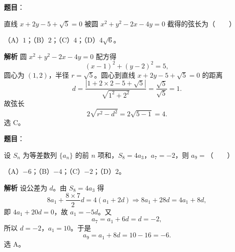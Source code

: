 \begin{answer}

\textbf{题目}：

直线 $x+2y-5+\sqrt5=0$ 被圆 $x^2+y^2-2x-4y=0$ 截得的弦长为\mbox{（　　）}

（A）$1$；（B）$2$；（C）$4$；（D）$4\sqrt6$。

\textbf{解析}
圆 $x^2+y^2-2x-4y=0$ 配方得
\nopagebreak[4]
\[(x-1)^2+(y-2)^2=5,\]
圆心为 $(1,2)$，半径 $r=\sqrt5$。圆心到直线 $x+2y-5+\sqrt5=0$ 的距离
\nopagebreak[4]
\[d=\frac{|1+2\times2-5+\sqrt5|}{\sqrt{1^2+2^2}}=\frac{\sqrt5}{\sqrt5}=1.\]
故弦长
\nopagebreak[4]
\[2\sqrt{r^2-d^2}=2\sqrt{5-1}=4.\]
选 C。


\end{answer}
\begin{answer}

\textbf{题目}：

设 $S_n$ 为等差数列 $\{a_n\}$ 的前 $n$ 项和，$S_8=4a_3$，$a_7=-2$，则 $a_9=$\mbox{（　　）}

（A）$-6$；（B）$-4$；（C）$-2$；（D）$2$。

\textbf{解析}
设公差为 $d$。由 $S_8=4a_3$ 得
\nopagebreak[4]
\[8a_1+\frac{8\times7}2d=4(a_1+2d)\Longrightarrow 8a_1+28d=4a_1+8d,\]
即 $4a_1+20d=0$，故 $a_1=-5d$。又
\nopagebreak[4]
\[a_7=a_1+6d=d=-2,\]
所以 $d=-2$，$a_1=10$。于是
\nopagebreak[4]
\[a_9=a_1+8d=10-16=-6.\]
选 A。


\end{answer}
